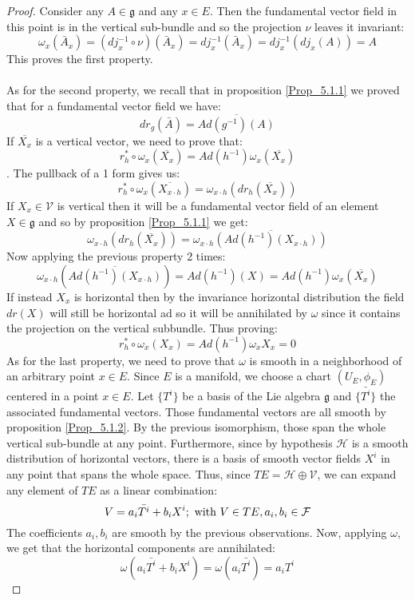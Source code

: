 \documentclass[12pt,a4paper]{report}
\theoremstyle{definition}
\theoremstyle{Theorem}
\theoremstyle{definition}
\theoremstyle{definition}
\begin{document}
	\begin{proof}
		Consider any $A\in\mathfrak{g}$ and any $x\in E$. Then the fundamental vector field in this point is in the vertical sub-bundle and so the projection $\nu$ leaves it invariant:
		$$\omega_{x}(\bar{A}_{x})=(dj_{x}^{-1}\circ \nu)(\bar{A}_{x})=dj_{x}^{-1}(\bar{A}_{x})=
		dj_{x}^{-1}(dj_{x}(A))=A$$
		This proves the first property.\\
		\\
		As for the second property, we recall that in proposition \ref{Prop_5.1.1} we proved that for a fundamental vector field  we have:
		$$dr_g(\bar{A})=\overline{Ad(g^{-1})(A)}$$
		If $\overline{X_x}$ is a vertical vector, we need to prove that:
		$$r^*_h\circ \omega_{x}(\overline{X_{x}})=Ad(h^{-1})\omega_{x}(\overline{X_{x}})$$. 
		The pullback of a 1 form gives us:
		$$r^*_h\circ \omega_{x}(\overline{X_{x\cdot h}})=\omega_{x\cdot h}(dr_h(\overline{X_{x}}))$$
		If $X_{x}\in\mathcal{V}$ is vertical then it will be a fundamental vector field of an element $X\in\mathfrak{g}$ and so by proposition \ref{Prop_5.1.1} we get:
		$$\omega_{x\cdot h}(dr_h(\overline{X_{x}}))=\omega_{x\cdot h}\overline{(Ad(h^{-1})(X_{x\cdot h}))}$$
		Now applying the previous property 2 times:
		$$\omega_{x\cdot h}(\overline{Ad(h^{-1})(X_{x\cdot h})})=Ad(h^{-1})(X)=Ad(h^{-1})\omega_{x}(\overline{X_{x}})$$
		If instead $X_{x}$ is horizontal then by the invariance horizontal distribution the field $dr(X)$ will still be horizontal ad so it will be annihilated by $\omega$ since it contains the projection on the vertical subbundle. Thus proving:
		$$r^*_h\circ \omega_{x}(X_{x})=Ad(h^{-1})\omega_{x}X_{x}=0$$
		As for the last property, we need to prove that $\omega$ is smooth in a neighborhood of an arbitrary point $x\in E$. Since $E$ is a manifold, we choose a chart $(U_E,\phi_E)$ centered in a point $x\in E$. Let $\{T^i\}$ be a basis of the Lie algebra $\mathfrak{g}$ and $\{\bar{T^i}\}$ the associated fundamental vectors. Those fundamental vectors are all smooth by proposition \ref{Prop_5.1.2}. By the previous isomorphism, those span the whole vertical sub-bundle at any point. Furthermore, since by hypothesis $\mathcal{H}$ is a smooth distribution of horizontal vectors, there is a basis of smooth vector fields $X^i$ in any point that spans the whole space. Thus, since $TE=\mathcal{H}\oplus\mathcal{V}$, we can expand any element of $TE$ as a linear combination:
		$$V=a_i \bar{T^i}+b_iX^i;\hbox{ with } V\in TE, a_i,b_i\in \mathcal{F}$$
		The coefficients $a_i,b_i$ are smooth by the previous observations. Now, applying $\omega$, we get that the horizontal components are annihilated:
		$$\omega(a_i \bar{T^i}+b_iX^i)=\omega(a_i \bar{T^i})=a_i T^i$$
	\end{proof}
\end{document}

